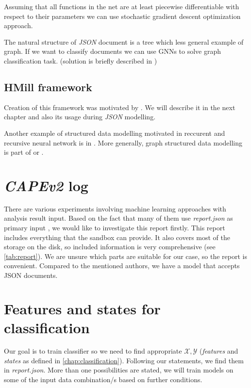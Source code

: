 Assuming that all functions in the net are at least piecewise differentiable with respect to their parameters we can use stochastic gradient descent optimization approach.

The natural structure of \emph{JSON} document is a tree which less general example of graph. If we want to classify documents we can use GNNs to solve graph classification task. (solution is briefly described in \cite{Pevny2020})

\subsection{HMill framework}
Creation of this framework was motivated by \cite{Pevny2016a}. We will describe it in the next chapter and also its usage during \emph{JSON} modelling.

Another example of structured data modelling motivated in reccurent and recursive neural network is in \cite{Woof2020}. More generally, graph structured data modelling is part of \cite{Henaff2015} or \cite{Borgwardt2005}.


\section{\emph{CAPEv2} log}
There are various experiments involving machine learning approaches with analysis result input. Based on the fact that many of them use \emph{report.json} as primary input \cite{Darshan2016, Dinh2019a, Kim2020, Sethi2019}, we would like to investigate this report firstly. This report includes everything that the sandbox can provide. It also covers most of the storage on the disk, so included information is very comprehensive (see \ref{tab:report}). We are unsure which parts are suitable for our case, so the report is convenient. Compared to the mentioned authors, we have a model that accepts JSON documents.

\section{Features and states for classification}
Our goal is to train classifier so we need to find appropriate $\mathcal{X}, \mathcal{Y}$ (\emph{features} and \emph{states} as defined in \ref{chap:classification}). Following our statements, we find them in \emph{report.json}. More than one possibilities are stated, we will train models on some of the input data combination/s  based on further conditions.

